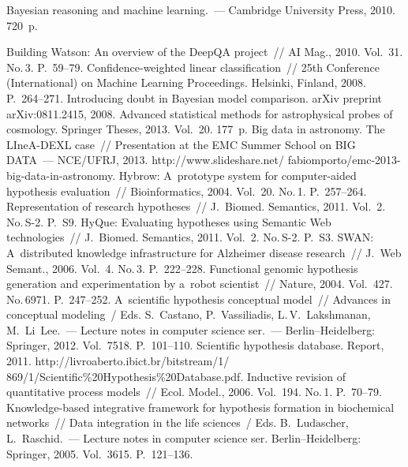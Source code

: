 \begin{multicols}{2}
{{\begin{thebibliography}{99}
 Bayesian reasoning and machine learning.~--- Cambridge University
Press, 2010.  720~p.

 Building Watson: An overview of the DeepQA project~// AI Mag.,
2010. Vol.~31. No.\,3. P.~59--79.
 Confidence-weighted linear
classification~// 25th Conference (International) on Machine Learning Proceedings.
Helsinki, Finland, 2008.  P.~264--271.
 Introducing doubt in Bayesian
model comparison. arXiv preprint arXiv:0811.2415, 2008.
 Advanced statistical methods for astrophysical probes of
cosmology. Springer Theses, 2013.  Vol.~20. 177~p.
 Big data in astronomy. The LIneA-DEXL case~// Presentation at the
EMC Summer School on BIG DATA~--- NCE/UFRJ, 2013.
{\sf
http://www.slideshare.net/ fabiomporto/emc-2013-big-data-in-astronomy}.
 Hybrow: A~prototype
system for computer-aided hypothesis evaluation~// Bioinformatics, 2004. Vol.~20.
No.\,1. P.~257--264.
 Representation of research
hypotheses~// J.~Biomed. Semantics, 2011. Vol.~2. No.\,S-2. P.~S9.
 HyQue: Evaluating hypotheses using
Semantic Web technologies~// J.~Biomed. Semantics, 2011. Vol.~2. No.\,S-2.
P.~S3.
SWAN: A~distributed knowledge infrastructure for Alzheimer disease
research~// J.~Web Semant., 2006. Vol.~4. No.\,3. P.~222--228.
 Functional genomic hypothesis generation and
experimentation by a~robot scientist~// Nature, 2004.  Vol.~427. No.\,6971.
P.~247--252.
A~scientific hypothesis conceptual model~//
{Advances in conceptual modeling}~/
Eds. S.~Castano, P.~Vassiliadis, L.\,V.~Lakshmanan, M.~Li~Lee.~---
Lecture notes in computer science ser.~--- Berlin--Heidelberg: Springer, 2012.
Vol.~7518. P.~101--110.
 Scientific hypothesis database. Report, 2011.
{\sf
http://livroaberto.ibict.br/bitstream/1/ 869/1/Scientific\%20Hypothesis\%20Database.pdf}.
 Inductive revision of
quantitative process models~// Ecol. Model., 2006. Vol.~194. No.\,1.
P.~70--79.
 Knowledge-based integrative
framework for hypothesis formation in biochemical networks~// Data
integration in the life sciences~/
Eds. B.~Lud$\ddot{\mbox{a}}$scher, L.~Raschid.~---
Lecture notes in computer science ser. Berlin--Heidelberg: Springer,
2005. Vol.~3615. P.~121--136.


\end{thebibliography}}}
\end{multicols}
